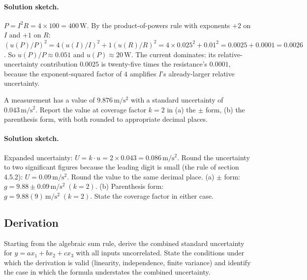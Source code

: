 \paragraph{Solution sketch.}
$P = I^{2}R = 4 \times 100 = 400 \,\si{\watt}$. By the
product-of-powers rule with exponents $+2$ on $I$ and $+1$ on $R$:
$(u(P)/P)^{2} = 4 (u(I)/I)^{2} + 1 (u(R)/R)^{2} =
4 \times 0.025^{2} + 0.01^{2} = 0.0025 + 0.0001 = 0.0026$. So
$u(P)/P \approx 0.051$ and $u(P) \approx 20 \,\si{\watt}$. The
current dominates: its relative-uncertainty contribution
$0.0025$ is twenty-five times the resistance's $0.0001$, because
the exponent-squared factor of $4$ amplifies $I$'s already-larger
relative uncertainty.

\begin{exercise}
A measurement has a value of $9.876 \,\si{\meter\per\second\squared}$
with a standard uncertainty of $0.043 \,\si{\meter\per\second
\squared}$. Report the value at coverage factor $k = 2$ in (a) the
$\pm$ form, (b) the parenthesis form, with both rounded to
appropriate decimal places.
\end{exercise}

\paragraph{Solution sketch.}
Expanded uncertainty: $U = k \cdot u = 2 \times 0.043 = 0.086 \,\si
{\meter\per\second\squared}$. Round the uncertainty to two
significant figures because the leading digit is small (the rule
of section 4.5.2): $U = 0.09 \,\si{\meter\per\second\squared}$.
Round the value to the same decimal place. (a) $\pm$ form:
$g = 9.88 \pm 0.09 \,\si{\meter\per\second\squared} \;(k = 2)$.
(b) Parenthesis form: $g = 9.88(9) \,\si{\meter\per\second\squared}
\;(k = 2)$. State the coverage factor in either case.

\subsection*{Derivation}

\begin{exercise}
Starting from the algebraic sum rule, derive the combined standard
uncertainty for $y = a x_{1} + b x_{2} + c x_{3}$ with all inputs
uncorrelated. State the conditions under which the derivation is
valid (linearity, independence, finite variance) and identify the
case in which the formula understates the combined uncertainty.
\end{exercise}

